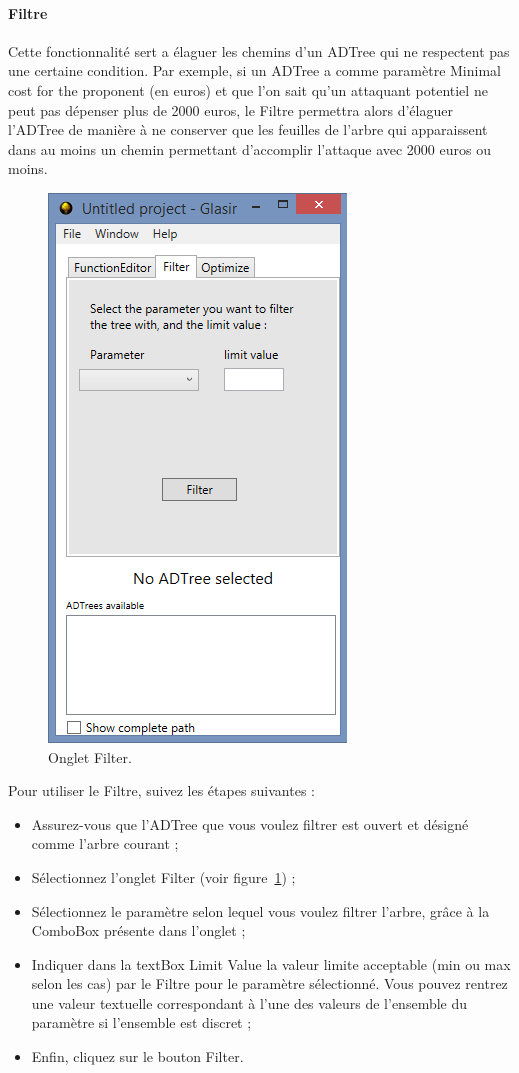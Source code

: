 \paragraph{Filtre} Cette fonctionnalité sert a élaguer les chemins d'un ADTree qui ne respectent pas une certaine condition. Par exemple, si un ADTree a comme paramètre \og Minimal cost for the proponent \fg (en euros) et que l'on sait qu'un attaquant potentiel ne peut pas dépenser plus de 2000 euros, le Filtre permettra alors d'élaguer l'ADTree de manière à ne conserver que les feuilles de l'arbre qui apparaissent dans au moins un chemin permettant d'accomplir l'attaque avec 2000 euros ou moins.

 \begin{figure}[H]
        \centering
        \includegraphics[height=0.7\textwidth]{figure/filter.png}
        \caption{Onglet Filter.}
        \label{fig:filter}
    \end{figure}

Pour utiliser le Filtre, suivez les étapes suivantes :

\begin{itemize}
\item Assurez-vous que l'ADTree que vous voulez filtrer est ouvert et désigné comme l'arbre courant ;
\item Sélectionnez l'onglet \og Filter \fg{} (voir {\sc figure}~\ref{fig:filter}) ;
\item Sélectionnez le paramètre selon lequel vous voulez filtrer l'arbre, grâce à la ComboBox présente dans l'onglet ;
\item Indiquer dans la textBox \og Limit Value \fg{} la valeur limite acceptable (min ou max selon les cas) par le Filtre pour le paramètre sélectionné. Vous pouvez rentrez une valeur textuelle correspondant à l'une des valeurs de l'ensemble du paramètre si l'ensemble est discret ;
\item Enfin, cliquez sur le bouton \og Filter\fg{}.
\end{itemize}

